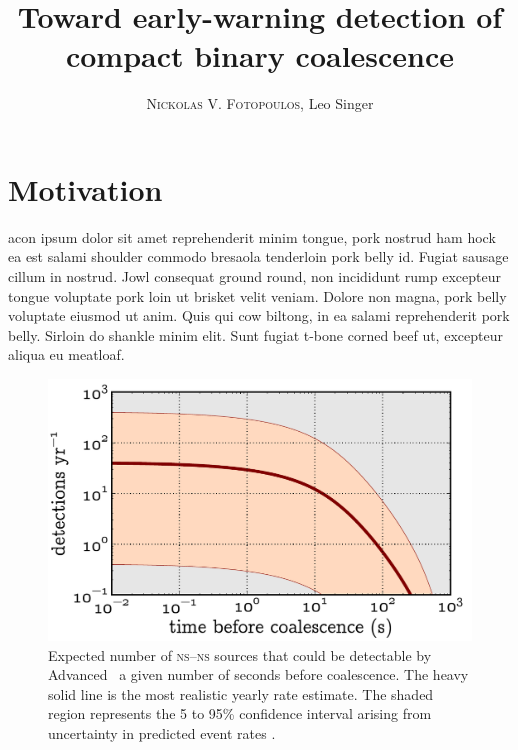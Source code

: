 \documentclass[portrait,plainboxedsections]{sciposter}
\title{Toward early-warning detection of compact binary coalescence}
\author{\textsc{Nickolas V. Fotopoulos}, Leo Singer}
\institute{LIGO Laboratory, California Institute of Technology}
\begin{document}

\maketitle

\begin{minipage}[t]{0.25\textwidth}

\section*{Motivation}

acon ipsum dolor sit amet reprehenderit minim tongue, pork nostrud
ham hock ea est salami shoulder commodo bresaola tenderloin pork belly id.
Fugiat sausage cillum in nostrud. Jowl consequat ground round, non incididunt
rump excepteur tongue voluptate pork loin ut brisket velit veniam. Dolore non
magna, pork belly voluptate eiusmod ut anim. Quis qui cow biltong, in ea salami
reprehenderit pork belly. Sirloin do shankle minim elit. Sunt fugiat t-bone
corned beef ut, excepteur aliqua eu meatloaf.
%
\begin{figure}[h]
\includegraphics{figures/snr_in_time}
\caption{\label{fig:earlywarning}Expected number of \textsc{ns}--\textsc{ns}
sources that could be detectable by Advanced \LIGO\ a given number of seconds
before coalescence.  The heavy solid line is the most realistic yearly rate
estimate.  The shaded region represents the 5 to 95\% confidence interval
arising from uncertainty in predicted event rates \cite{Abadie:2010p10836}.}
\end{figure}
%
\begin{figure}[h]

\end{figure}
\end{minipage}
\end{document}
